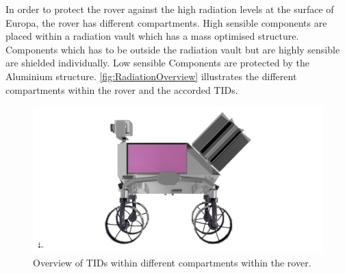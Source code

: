\label{subsec:RadiationConclusion}

In order to protect the rover against the high radiation levels at the surface of Europa, the rover has different compartments. High sensible components are placed within a radiation vault which has a mass optimised structure. Components which has to be outside the radiation vault but are highly sensible are shielded individually. Low sensible Components are protected by the Aluminium structure. \autoref{fig:RadiationOverview} illustrates the different compartments within the rover and the accorded TIDs.

\begin{figure}[htb]
     \centering
     \includegraphics[width=\textwidth]{Media/INSPIRE_Radiation}
     \caption{Overview of TIDs within different compartments within the rover.}
     \label{fig:RadiationOverview}
\end{figure}

\clearpage
